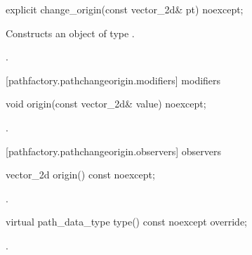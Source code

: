 \begin{itemdecl}
    explicit change_origin(const vector_2d& pt) noexcept;
\end{itemdecl}
\begin{itemdescr}
	\pnum
	\effects
	Constructs an object of type .
	
	\pnum
	\postconditions
	.
\end{itemdescr}

 [pathfactory.pathchangeorigin.modifiers]{ modifiers}

\begin{itemdecl}
    void origin(const vector_2d& value) noexcept;
\end{itemdecl}
\begin{itemdescr}
	\pnum
	\postconditions
	.
\end{itemdescr}

 [pathfactory.pathchangeorigin.observers]{ observers}

\begin{itemdecl}
    vector_2d origin() const noexcept;
\end{itemdecl}
\begin{itemdescr}
	\pnum
	\returns
	.
\end{itemdescr}

\begin{itemdecl}
    virtual path_data_type type() const noexcept override;
\end{itemdecl}
\begin{itemdescr}
	\pnum
	\returns
	.
\end{itemdescr}
